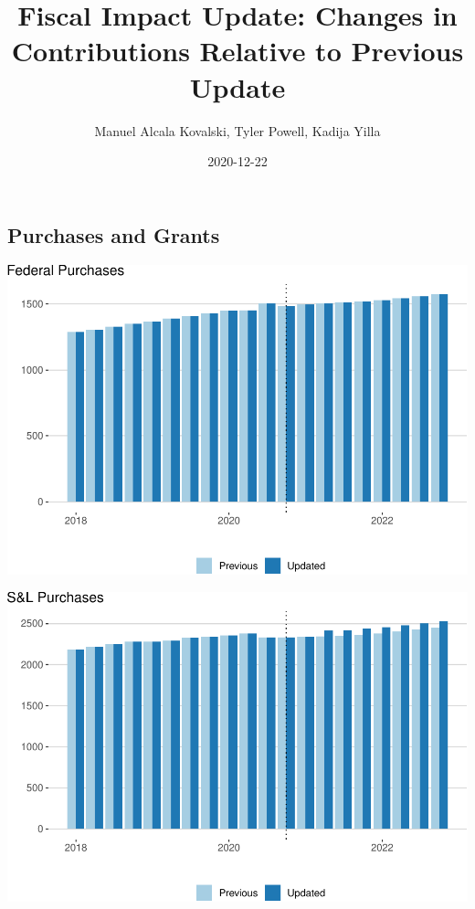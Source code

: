 \documentclass[
]{article}
\title{Fiscal Impact Update: Changes in Contributions Relative to
Previous Update}
\author{Manuel Alcala Kovalski, Tyler Powell, Kadija Yilla}
\date{2020-12-22}
\begin{document}
\maketitle

\hypertarget{purchases-and-grants}{%
\subsection{Purchases and Grants}\label{purchases-and-grants}}

\begin{center}\includegraphics{update-changes-levels_files/figure-latex/purchases-federal-1} \end{center}

\begin{center}\includegraphics{update-changes-levels_files/figure-latex/purchases-state-1} \end{center}
\end{document}
